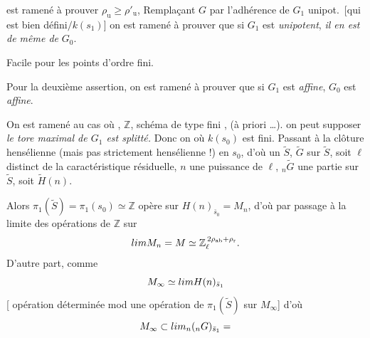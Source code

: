 \documentclass[11pt,a4paper]{article}
\begin{document}

est ramené à prouver $\rho_{\mathrm{u}} \geqslant
\rho'_{\mathrm{u}}$,  Remplaçant $G$ par l'adhérence de $G_1$
unipot.\ [qui est bien
défini$/k(s_1)$] on est ramené  à prouver que si $G_1$ est
\emph{unipotent}, \emph{il en est de même de} $G_0$.


Facile pour les points d'ordre fini.

Pour la deuxième assertion, on est ramené à prouver que si $G_1$ est
\emph{affine}, $G_0$ est \emph{affine}.


On est ramené au cas où  ,  $\mathbb{Z}$, \ill{} schéma 
de type fini , (à priori …).  \struck{\ill{}} on peut supposer
\emph{le tore maximal de $G_1$ est splitté.} Donc on 
où $k(s_0)$ est fini. Passant à la clôture hensélienne (mais pas
strictement hensélienne !) en $s_0$, d'où un $\tilde S$, $\tilde G$ sur
$\tilde S$,  soit $\ell$ distinct de la
caractéristique résiduelle, $n$ une puissance de $\ell$,
${}_n\tilde G$ \ill{} une partie \ill{} \ill{} sur $\tilde S$, soit
$\tilde H(n)$.


Alors $\pi_1(\tilde S) = \pi_1(s_0) \simeq \mathbb{Z}$ opère
sur $H(n)_{\bar s_0} = M_n$, d'où par passage à la limite des opérations de
$\mathbb{Z}$ sur
\[
  \varprojlim M_n = M \simeq \mathbb{Z}_\ell^{\,2\rho_{\mathrm{ab}} +
  \rho_{\mathrm{r}}}.
\]
D'autre part,  comme
\[
  M_\infty \simeq \varprojlim H(n)_{\bar s_1}
\]
[\struck{\ill{}} opération déterminée mod une opération de
$\pi_1(\tilde S)$ sur $M_\infty$] d'où
\[
  M_\infty \subset \varprojlim_n ({}_nG)_{\bar s_1} =
\]
\end{document}
